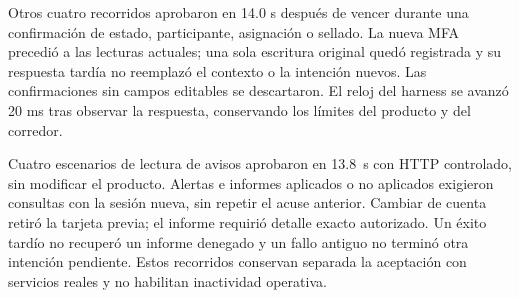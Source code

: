 Otros cuatro recorridos aprobaron en 14.0 s después de vencer durante una
confirmación de estado, participante, asignación o sellado. La nueva MFA precedió
a las lecturas actuales; una sola escritura original quedó registrada y su
respuesta tardía no reemplazó el contexto o la intención nuevos. Las confirmaciones
sin campos editables se descartaron. El reloj del harness se avanzó 20 ms tras
observar la respuesta, conservando los límites del producto y del corredor.

Cuatro escenarios de lectura de avisos aprobaron en 13.8~s con HTTP controlado,
sin modificar el producto. Alertas e informes aplicados o no aplicados exigieron
consultas con la sesión nueva, sin repetir el acuse anterior. Cambiar de cuenta
retiró la tarjeta previa; el informe requirió detalle exacto autorizado. Un éxito
tardío no recuperó un informe denegado y un fallo antiguo no terminó otra
intención pendiente. Estos recorridos conservan separada la aceptación con
servicios reales y no habilitan inactividad operativa.
